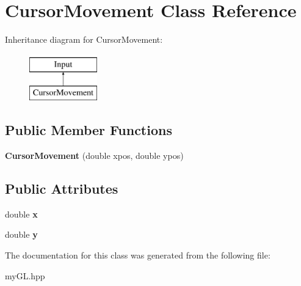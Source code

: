\hypertarget{classCursorMovement}{}\section{Cursor\+Movement Class Reference}
\label{classCursorMovement}
Inheritance diagram for Cursor\+Movement\+:\begin{figure}[H]
\begin{center}
\leavevmode
\includegraphics[height=2.000000cm]{classCursorMovement}
\end{center}
\end{figure}
\subsection*{Public Member Functions}
\begin{DoxyCompactItemize}
\item 
{\bfseries Cursor\+Movement} (double xpos, double ypos)\hypertarget{classCursorMovement_a5d4ae67fcfe792baff996121b694e7c3}{}\label{classCursorMovement_a5d4ae67fcfe792baff996121b694e7c3}

\end{DoxyCompactItemize}
\subsection*{Public Attributes}
\begin{DoxyCompactItemize}
\item 
double {\bfseries x}\hypertarget{classCursorMovement_ac77861debf3dc2013b7ee0f6775b6540}{}\label{classCursorMovement_ac77861debf3dc2013b7ee0f6775b6540}

\item 
double {\bfseries y}\hypertarget{classCursorMovement_afab93e8fcc9f845fdcf6fffdf9232cab}{}\label{classCursorMovement_afab93e8fcc9f845fdcf6fffdf9232cab}

\end{DoxyCompactItemize}


The documentation for this class was generated from the following file\+:\begin{DoxyCompactItemize}
\item 
my\+G\+L.\+hpp\end{DoxyCompactItemize}
